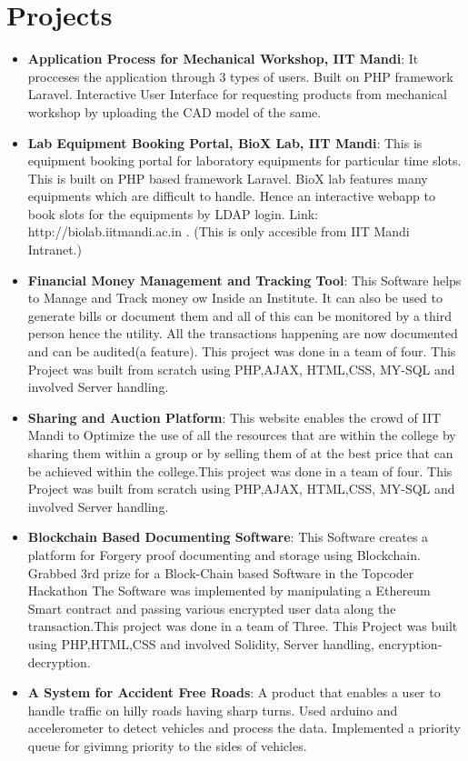 \documentclass[letterpaper,11pt]{article}
\newcommand{\resumeItem}[2]{
  \item\small{
    \textbf{#1}{: #2 \vspace{-2pt}}
  }
}
\newcommand{\resumeSubItem}[2]{\resumeItem{#1}{#2}\vspace{-4pt}}
\newcommand{\resumeSubHeadingListStart}{\begin{itemize}[leftmargin=*]}
\newcommand{\resumeSubHeadingListEnd}{\end{itemize}}
\begin{document}
\section{Projects}
  \resumeSubHeadingListStart
    \resumeSubItem{Application Process for Mechanical Workshop, IIT Mandi}
      {It procceses the application through 3 types of users. Built on PHP framework Laravel. Interactive User Interface for requesting products from mechanical workshop by uploading the CAD model of the same.}
    \resumeSubItem{Lab Equipment Booking Portal, BioX Lab, IIT Mandi}
      {This is equipment booking portal for laboratory equipments for particular time slots. This is built on PHP based framework Laravel. BioX lab features many equipments which are difficult to handle. Hence an interactive webapp to book slots for the equipments by LDAP login. Link: http://biolab.iitmandi.ac.in . (This is only accesible from IIT Mandi Intranet.)}
    \resumeSubItem{Financial Money Management and Tracking Tool}
      {This Software helps to Manage and Track money ow Inside an Institute. It can also be used to generate bills
or document them and all of this can be monitored by a third person hence the utility. All the transactions
happening are now documented and can be audited(a feature). This project was done in a team of four.
This Project was built from scratch using PHP,AJAX, HTML,CSS, MY-SQL and involved Server handling.}
    \resumeSubItem{Sharing and Auction Platform}
      {This website enables the crowd of IIT Mandi to Optimize the use of all the resources that are within the
college by sharing them within a group or by selling them of at the best price that can be achieved within the
college.This project was done in a team of four.
This Project was built from scratch using PHP,AJAX, HTML,CSS, MY-SQL and involved Server handling.}
      \resumeSubItem{Blockchain Based Documenting Software}
      {This Software creates a platform for Forgery proof documenting and storage using Blockchain.
Grabbed 3rd prize for a Block-Chain based Software in the Topcoder Hackathon
The Software was implemented by manipulating a Ethereum Smart contract and passing various encrypted
user data along the transaction.This project was done in a team of Three.
This Project was built using PHP,HTML,CSS and involved Solidity, Server handling, encryption-decryption.}
      \resumeSubItem{A System for Accident Free Roads}
      {A product that enables a user to handle traffic on hilly roads having sharp turns. Used arduino and accelerometer to detect vehicles and process the data. Implemented a priority queue for givimng priority to the sides of vehicles. }
  \resumeSubHeadingListEnd
\end{document}

